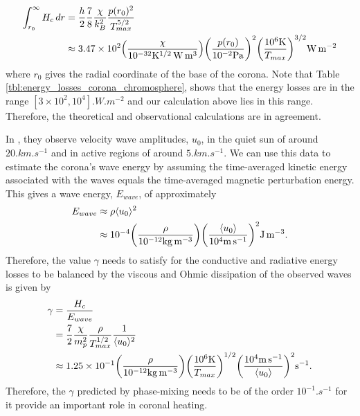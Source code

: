 \begin{equation}
    \begin{aligned}
    \int_{r_0}^\infty H_c \, dr &= \frac{h}{2}\frac{7}{8}\frac{\chi}{k_B^2}\frac{p(r_0)^2}{T_{max}^{5/2}} \\
    &\approx 3.47\times10^{2}\qty(\frac{\chi}{10^{-32}\si{.K^{1/2}.W.m^3}})\qty(\frac{p(r_0)}{10^{-2}\si{.Pa}})^2\qty(\frac{10^6\si{.K}}{T_{max}})^{3/2}\si{.W.m^{-2}}
    \end{aligned}
\end{equation}
where $r_0$ gives the radial coordinate of the base of the corona. Note that Table \ref{tbl:energy_losses_corona_chromosphere}, shows that the energy losses are in the range $[3\times10^2,10^4]\si{.W.m^{-2}}$ and our calculation above lies in this range. Therefore, the theoretical and observational calculations are in agreement. 

In \citet{McIntosh2011,McIntosh2012}, they observe velocity wave amplitudes, $u_0$, in the quiet sun of around $20\si{.km.s^{-1}}$ and in active regions of around $5\si{.km.s^{-1}}$. We can use this data to estimate the corona's wave energy by assuming the time-averaged kinetic energy associated with the waves equals the time-averaged magnetic perturbation energy. This gives a wave energy, $E_{wave}$, of approximately
\begin{equation}
    \label{eq:chap_3_observed_wave_energy}
    \begin{aligned}
    E_{wave} &\approx \rho \langle u_0 \rangle^2 \\
    &\approx10^{-4}\qty(\frac{\rho}{10^{-12}\si{.kg.m^{-3}}}) \qty(\frac{\langle u_0 \rangle}{10^4 \si{.m.s^{-1}}})^2\si{.J.m^{-3}}.
    \end{aligned}
\end{equation}
Therefore, the value $\gamma$ needs to satisfy for the conductive and radiative energy losses to be balanced by the viscous and Ohmic dissipation of the observed waves is given by
\begin{equation}
\label{eq:required_gamma}
\begin{aligned}
    \gamma &= \frac{H_c}{E_{wave}} \\
    &= \frac{7}{2}\frac{\chi}{m_p^2}\frac{\rho}{T_{max}^{1/2}}\frac{1}{\langle u_0\rangle^2} \\
    &\approx1.25\times10^{-1}\qty(\frac{\rho}{10^{-12}\si{.kg.m^{-3}}})\qty(\frac{10^6\si{.K}}{T_{max}})^{1/2}\qty(\frac{10^{4}\si{.m.s^{-1}}}{\langle u_0 \rangle})^2\si{.s^{-1}}.
\end{aligned}
\end{equation}
Therefore, the $\gamma$ predicted by phase-mixing needs to be of the order $10^{-1}\si{.s^{-1}}$ for it provide an important role in coronal heating.


